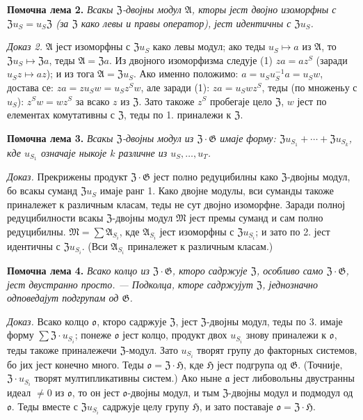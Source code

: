 \documentclass[11pt]{article}
\begin{document}
\noindent\textbf{Помочна лема 2.} \emph{Всакы \(\mathfrak Z\)-двојны модул \(\mathfrak A\), кторы јест двојно изоморфны с \(\mathfrak Zu_S=u_S\mathfrak Z\) (за \(\mathfrak Z\) како левы и правы оператор), јест идентичны с \(\mathfrak Zu_S\).}

\noindent\emph{Доказ 2.} \(\mathfrak A\) јест изоморфны с \(\mathfrak Zu_S\) како левы модул; ако теды \(u_S\mapsto a\) из \(\mathfrak A\), то \(\mathfrak Zu_S\mapsto\mathfrak Za\), теды \(\mathfrak A=\mathfrak Za\). Из двојного изоморфизма следује (1) \(za=az^S\) (заради \(u_Sz\mapsto az\)); и из тога \(\mathfrak A=\mathfrak Zu_S\). Ако именно положимо: \(a=u_Su_S^{-1}a=u_Sw\), достава се: \(za=zu_Sw=u_Sz^Sw\), але заради (1): \(za=u_Swz^S\), теды (по множеньу с \(u_S\)): \(z^Sw=wz^S\) за всако \(z\) из \(\mathfrak Z\). Зато такоже \(z^S\) пробегаје цело \(\mathfrak Z\), \(w\) јест по елементах комутативны с \(\mathfrak Z\), теды по 1. приналежи к \(\mathfrak Z\).

\noindent\textbf{Помочна лема 3.} \emph{Всакы \(\mathfrak Z\)-двојны модул из \(\mathfrak Z\cdot\mathfrak G\) имаје форму: \(\mathfrak Zu_{S_1}+\cdots+\mathfrak Zu_{S_k}\), кде \(u_{S_1}\) означаје ныкоје \(k\) различне из \(u_S,\ldots,u_T\).}

\noindent\emph{Доказ.} Прекрижены продукт \(\mathfrak Z\cdot\mathfrak G\) јест полно редуцибилны како \(\mathfrak Z\)-двојны модул, бо всакы суманд \(\mathfrak Zu_S\) имаје ранг 1. Како двојне модулы, вси суманды такоже приналежет к различным класам, теды не сут двојно изоморфне. Заради полној редуцибилности всакы \(\mathfrak Z\)-двојны модул \(\mathfrak M\) јест премы суманд и сам полно редуцибилны. \(\mathfrak M=\sum\mathfrak A_{S_i}\), кде \(\mathfrak A_{S_i}\) јест изоморфны с \(\mathfrak Zu_{S_i}\); и зато по 2. јест идентичны с \(\mathfrak Zu_{S_i}\). (Вси \(\mathfrak A_{S_i}\) приналежет к различным класам.)

\noindent\textbf{Помочна лема 4.} \emph{Всако колцо из \(\mathfrak Z\cdot\mathfrak G\), кторо садржује \(\mathfrak Z\), особливо само \(\mathfrak Z\cdot\mathfrak G\), јест двустранно просто. --- Подколца, кторе садржујут \(\mathfrak Z\), једнозначно одповедајут подгрупам од \(\mathfrak G\).}

\noindent\emph{Доказ.} Всако колцо \(\mathfrak o\), кторо садржује \(\mathfrak Z\), јест \(\mathfrak Z\)-двојны модул, теды по 3. имаје форму \(\sum\mathfrak Z\cdot u_{S_i}\); понеже \(\mathfrak o\) јест колцо, продукт двох \(u_{S_i}\) знову приналежи к \(\mathfrak o\), теды такоже приналежечи \(\mathfrak Z\)-модул. Зато \(u_{S_i}\) творят групу до факторных системов, бо јих јест конечно много. Теды \(\mathfrak o=\mathfrak Z\cdot\mathfrak H\), кде \(\mathfrak H\) јест подгрупа од \(\mathfrak G\). (Точније, \(\mathfrak Z\cdot u_{S_i}\) творят мултипликативны систем.) Ако ныне \(\mathfrak a\) јест либовольны двустранны идеал \(\neq0\) из \(\mathfrak o\), то он јест \(\mathfrak o\)-двојны модул, и тым \(\mathfrak Z\)-двојны модул и подмодул од \(\mathfrak o\). Теды вместе с \(\mathfrak Zu_{S_i}\) садржује целу групу \(\mathfrak H\), и зато поставаје \(\mathfrak o=\mathfrak Z\cdot\mathfrak H\).
\end{document}
